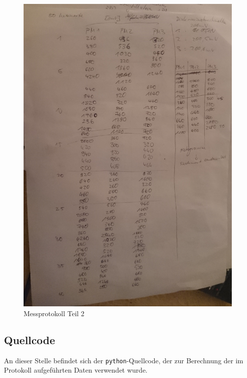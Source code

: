 	\begin{figure}[ht]
						\centering
						\includegraphics[width = 1.\linewidth]{pic/mess2.png}
						\caption{Messprotokoll Teil 2}
	\end{figure}
\subsection{Quellcode}
An dieser Stelle befindet sich der \texttt{python}-Quellcode, der zur Berechnung der im Protokoll aufgeführten Daten verwendet wurde.






